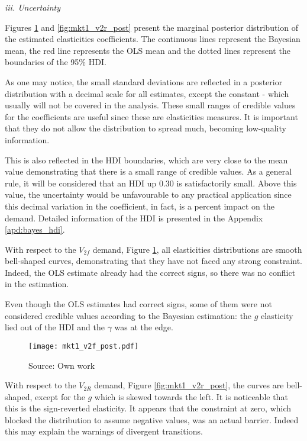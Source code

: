 

\textit{iii. Uncertainty}

Figures \ref{fig:mkt1_v2f_post} and \ref{fig:mkt1_v2r_post} present the marginal posterior distribution of the estimated elasticities coefficients. The continuous lines represent the Bayesian mean, the red line represents the OLS mean and the dotted lines represent the boundaries of the 95\% HDI.

As one may notice, the small standard deviations are reflected in a posterior distribution with a decimal scale for all estimates, except the constant - which usually will not be covered in the analysis. These small ranges of credible values for the coefficients are useful since these are elasticities measures. It is important that they do not allow the distribution to spread much, becoming low-quality information. 

This is also reflected in the HDI boundaries, which are very close to the mean value demonstrating that there is a small range of credible values. As a general rule, it will be considered that an HDI up 0.30 is satisfactorily small. Above this value, the uncertainty would be unfavourable to any practical application since this decimal variation in the coefficient, in fact, is a percent impact on the demand. Detailed information of the HDI is presented in the Appendix \ref{apd:bayes_hdi}. 

With respect to the $V_{2f}$ demand, Figure \ref{fig:mkt1_v2f_post}, all elasticities distributions are smooth bell-shaped curves, demonstrating that they have not faced any strong constraint. Indeed, the OLS estimate already had the correct signs, so there was no conflict in the estimation.

Even though the OLS estimates had correct signs, some of them were not considered credible values according to the Bayesian estimation: the $g$ elasticity lied out of the HDI and the $\gamma$ was at the edge. 

\begin{figure}[H]
\centering
\texttt{[image: mkt1\_v2f\_post.pdf]}
\caption{Posterior density function of elasticities w.r.t $V_{2F}$ - Market 1}
\label{fig:mkt1_v2f_post}
\caption*{Source: Own work}
\end{figure} 

With respect to the $V_{2R}$ demand, Figure \ref{fig:mkt1_v2r_post}, the curves are bell-shaped, except for the $g$ which is skewed towards the left. It is noticeable that this is the sign-reverted elasticity. It appears that the constraint at zero, which blocked the distribution to assume negative values, was an actual barrier. Indeed this may explain the warnings of divergent transitions.

